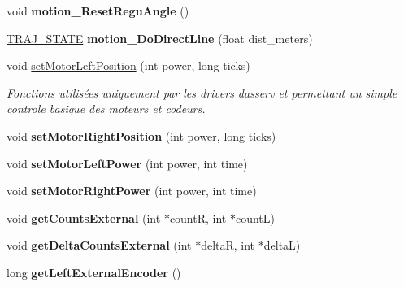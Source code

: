 \begin{DoxyCompactItemize}
void {\bfseries motion\+\_\+\+Reset\+Regu\+Angle} ()
\item 
\mbox{\label{classAsservDriver_a27f3a8fa56cc689d072a39efb1ed20b3}} 
\hyperlink{path__manager_8h_adb3360abeb29758da93865c8afcb80eb}{T\+R\+A\+J\+\_\+\+S\+T\+A\+TE} {\bfseries motion\+\_\+\+Do\+Direct\+Line} (float dist\+\_\+meters)
\item 
\mbox{\label{classAsservDriver_a49dad05da23fe62aa4bf582199eaa3a6}} 
void \hyperlink{classAsservDriver_a49dad05da23fe62aa4bf582199eaa3a6}{set\+Motor\+Left\+Position} (int power, long ticks)
\begin{DoxyCompactList}\small\item\em Fonctions utilisées uniquement par les drivers d\textquotesingle{}asserv et permettant un simple controle basique des moteurs et codeurs. \end{DoxyCompactList}\item 
\mbox{\label{classAsservDriver_a62a57e92e4933413d9c3c6b62f496ef3}} 
void {\bfseries set\+Motor\+Right\+Position} (int power, long ticks)
\item 
\mbox{\label{classAsservDriver_a3b702233fa09a657bb03372470152376}} 
void {\bfseries set\+Motor\+Left\+Power} (int power, int time)
\item 
\mbox{\label{classAsservDriver_a54e742670bae9a19dc70b982cad4c3ba}} 
void {\bfseries set\+Motor\+Right\+Power} (int power, int time)
\item 
\mbox{\label{classAsservDriver_a20f2e69b261448cac7c4d521e1e845d2}} 
void {\bfseries get\+Counts\+External} (int $\ast$countR, int $\ast$countL)
\item 
\mbox{\label{classAsservDriver_aa74a2ee4e100326d639c733892ff5852}} 
void {\bfseries get\+Delta\+Counts\+External} (int $\ast$deltaR, int $\ast$deltaL)
\item 
\mbox{\label{classAsservDriver_aa6924c9da7428d59fa712c15221dfbac}} 
long {\bfseries get\+Left\+External\+Encoder} ()
\item 
\mbox{\label{classAsservDriver_afda042c513d96188f8572899679cc616}} 

\end{DoxyCompactItemize}
